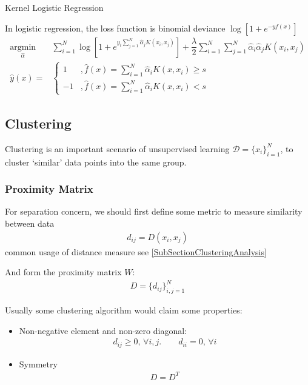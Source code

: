 \begin{point}
    Kernel Logistic Regression
\end{point}

    In logistic regression, the loss function is binomial deviance $ \log\left[1+e^{-yf(x)}\right] $
    \begin{align}
        \mathop{\arg\min}\limits_{\hat{\alpha } }&\sum_{i=1}^N\log \left[1+e^{y_i\sum_{j=1}^N\hat{\alpha }_jK(x_i,x_j)}\right]+\dfrac{\lambda }{2}\sum_{i=1}^N\sum_{j=1}^N  \hat{\alpha }_i\hat{\alpha }_jK(x_i,x_j)\\
        \hat{y}(x)=&\begin{cases}
            1 &,\hat{f}(x)=\sum_{i=1}^N\hat{\alpha }_iK(x,x_i)\geq s\\
            -1&,\hat{f}(x)=\sum_{i=1}^N\hat{\alpha }_iK(x,x_i)<s
        \end{cases}
    \end{align}
    

\subsection{Clustering}
    Clustering is an important scenario of unsupervised learning $ \mathcal{D}=\{x_i\}_{i=1}^N $, to cluster `similar' data points into the same group. 

\subsubsection{Proximity Matrix}
    For separation concern, we should first define some metric to measure similarity between data
    \begin{align}
        d_{ij}=D(x_i,x_j) 
    \end{align}
    common usage of distance measure see \autoref{SubSectionClusteringAnalysis}
    
    And form the proximity matrix $ W $:
    \begin{align}
    D=\{d_{ij}\}_{i,j=1}^N 
    \end{align}
    
    Usually some clustering algorithm would claim some properties:
\begin{itemize}[topsep=2pt,itemsep=0pt]
    \item Non-negative element and non-zero diagonal:
    \begin{align}
        d_{ij}\geq 0,\,\forall i,j.\qquad d_{ii}=0,\,\forall i 
    \end{align}
    \item Symmetry
    \begin{align}
        D=D^T 
    \end{align}
\end{itemize}


